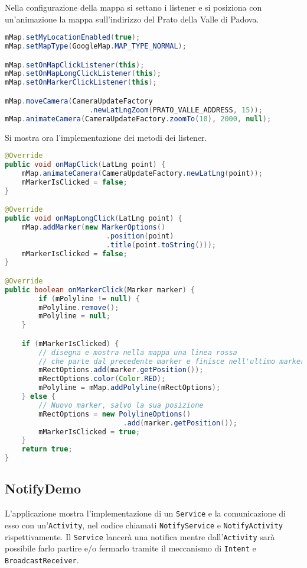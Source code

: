 Nella configurazione della mappa si settano i listener e si posiziona con un'animazione la mappa sull'indirizzo del Prato della Valle di Padova.

\begin{lstlisting}[language=Java]
mMap.setMyLocationEnabled(true);
mMap.setMapType(GoogleMap.MAP_TYPE_NORMAL);

mMap.setOnMapClickListener(this);
mMap.setOnMapLongClickListener(this);
mMap.setOnMarkerClickListener(this);

mMap.moveCamera(CameraUpdateFactory
					.newLatLngZoom(PRATO_VALLE_ADDRESS, 15));
mMap.animateCamera(CameraUpdateFactory.zoomTo(10), 2000, null);
\end{lstlisting}

Si mostra ora l'implementazione dei metodi dei listener.

\begin{lstlisting}[language=Java]
@Override
public void onMapClick(LatLng point) {
	mMap.animateCamera(CameraUpdateFactory.newLatLng(point));   
	mMarkerIsClicked = false;
}

@Override
public void onMapLongClick(LatLng point) {
	mMap.addMarker(new MarkerOptions()
						.position(point)
						.title(point.toString()));    
	mMarkerIsClicked = false;
}

@Override
public boolean onMarkerClick(Marker marker) {
		if (mPolyline != null) {
		mPolyline.remove();
		mPolyline = null;
	}

	if (mMarkerIsClicked) {
		// disegna e mostra nella mappa una linea rossa 
		// che parte dal precedente marker e finisce nell'ultimo marker
		mRectOptions.add(marker.getPosition());
		mRectOptions.color(Color.RED);
		mPolyline = mMap.addPolyline(mRectOptions);
	} else {
		// Nuovo marker, salvo la sua posizione
		mRectOptions = new PolylineOptions()
							.add(marker.getPosition());
		mMarkerIsClicked = true;
	}
	return true;
}
\end{lstlisting}


\subsection{NotifyDemo}

L'applicazione mostra l'implementazione di un \lstinline|Service| e la comunicazione di esso con un'\lstinline|Activity|, nel codice chiamati \lstinline|NotifyService| e \lstinline|NotifyActivity| rispettivamente. Il \lstinline|Service| lancerà una notifica mentre dall'\lstinline|Activity| sarà possibile farlo partire e/o fermarlo tramite il meccanismo di \lstinline|Intent| e \lstinline|BroadcastReceiver|.


